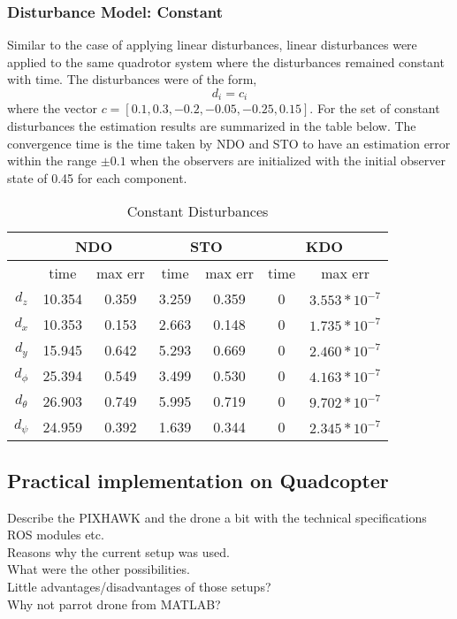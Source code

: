 \documentclass{article}
\begin{document}
\subsubsection{Disturbance Model: Constant}
Similar to the case of applying linear disturbances, linear disturbances were applied to the same quadrotor system where the disturbances remained constant with time. The disturbances were of the form, 
\begin{equation}
d_i = c_i
\label{eq:dist_4}
\end{equation}
where the vector $c=[0.1,0.3,-0.2,-0.05,-0.25,0.15]$. 
For the set of constant disturbances the estimation results are summarized in the table below. The convergence time is the time taken by NDO and STO to have an estimation error within the range $\pm0.1$ when the observers are initialized with the initial observer state of 0.45 for each component.
\begin{table}[!htbp]
\centering
\caption{Constant Disturbances}
\begin{tabular}{*7c}
\toprule
{}  &  \multicolumn{2}{c}{NDO} & \multicolumn{2}{c}{STO} & \multicolumn{2}{c}{KDO}\\
\midrule
{}        &   time   & max err  & time  & max err& time  & max err\\
$d_z$     &  10.354 & 0.359   & 3.259  & 0.359 & 0     & $3.553*10^{-7}$\\
$d_x$     &  10.353 & 0.153   & 2.663  & 0.148 & 0     & $1.735*10^{-7}$\\
$d_y$     &  15.945 & 0.642   & 5.293  & 0.669 & 0     & $2.460*10^{-7}$\\
$d_\phi$  &  25.394 & 0.549   & 3.499  & 0.530 & 0     & $4.163*10^{-7}$\\
$d_\theta$&  26.903 & 0.749   & 5.995  & 0.719 & 0     & $9.702*10^{-7}$\\
$d_\psi$  &  24.959 & 0.392   & 1.639  & 0.344 & 0     & $2.345*10^{-7}$\\
\bottomrule
\end{tabular}
\end{table}


\subsection{Practical implementation on Quadcopter}
Describe the PIXHAWK and the drone a bit with the technical specifications\\ROS modules etc.\\Reasons why the current setup was used.\\What were the other possibilities.\\Little advantages/disadvantages of those setups?\\Why not parrot drone from MATLAB? 
\end{document}

